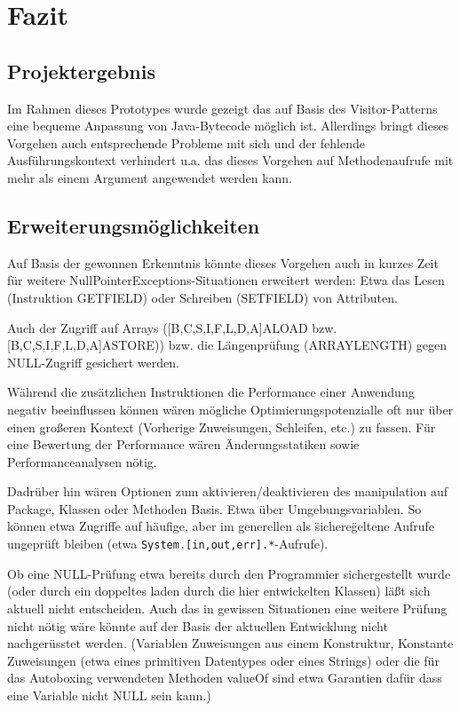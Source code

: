 
\chapter{Fazit}

\section{Projektergebnis}

Im Rahmen dieses Prototypes wurde gezeigt das auf Basis des Visitor-Patterns
eine bequeme Anpassung von Java-Bytecode möglich ist. Allerdings bringt
dieses Vorgehen auch entsprechende Probleme mit sich und der fehlende
Ausführungskontext verhindert u.a. das dieses Vorgehen auf Methodenaufrufe
mit mehr als einem Argument angewendet werden kann.


\section{Erweiterungsmöglichkeiten}

Auf Basis der gewonnen Erkenntnis könnte dieses Vorgehen auch in kurzes Zeit
für weitere NullPointerExceptions-Situationen erweitert werden: Etwa das
Lesen (Instruktion GETFIELD) oder Schreiben (SETFIELD) von Attributen.

Auch der Zugriff auf Arrays ([B,C,S,I,F,L,D,A]ALOAD bzw. [B,C,S,I,F,L,D,A]ASTORE))
bzw. die Längenprüfung (ARRAYLENGTH) gegen NULL-Zugriff gesichert werden.

Während die zusätzlichen Instruktionen die Performance einer Anwendung negativ beeinflussen
können wären mögliche Optimierungspotenzialle oft nur über einen großeren Kontext
(Vorherige Zuweisungen, Schleifen, etc.) zu fassen.
Für eine Bewertung der Performance wären Änderungsstatiken sowie Performanceanalysen
nötig.

Dadrüber hin wären Optionen zum aktivieren/deaktivieren des manipulation auf Package,
Klassen oder Methoden Basis. Etwa über Umgebungsvariablen.
So können etwa Zugriffe auf häufige, aber im generellen als \"sichere\" geltene Aufrufe
ungeprüft bleiben (etwa \texttt{System.[in,out,err].*}-Aufrufe).

Ob eine NULL-Prüfung etwa bereits durch den Programmier sichergestellt wurde
(oder durch ein doppeltes laden durch die hier entwickelten Klassen) läßt sich
aktuell nicht entscheiden. Auch das in gewissen Situationen eine weitere Prüfung
nicht nötig wäre könnte auf der Basis der aktuellen Entwicklung nicht nachgerüsstet werden.
(Variablen Zuweisungen aus einem Konstruktur, Konstante Zuweisungen (etwa eines
primitiven Datentypes oder eines Strings) oder die für das
Autoboxing verwendeten Methoden valueOf sind etwa Garantien dafür
dass eine Variable nicht NULL sein kann.)




